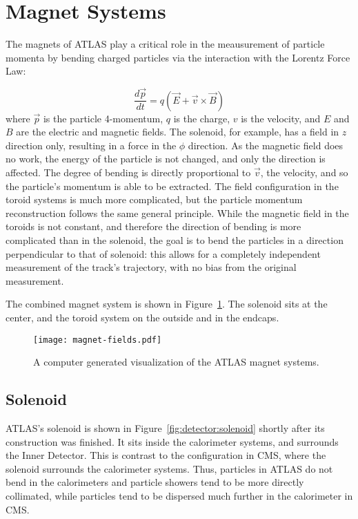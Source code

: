 \section{Magnet Systems}

The magnets of ATLAS play a critical role in the meausurement of particle momenta by bending charged particles via the interaction with the Lorentz Force Law:

\begin{equation}
\frac{d \vec{p}}{d t} = q (\vec{E} + \vec{v} \times \vec{B})
\end{equation}
%
where $\vec{p}$ is the particle 4-momentum, $q$ is the charge, $v$ is the velocity, and $E$ and $B$ are the electric and magnetic fields. The solenoid, for example, has a field in $z$ direction only, resulting in a force in the $\phi$ direction. As the magnetic field does no work, the energy of the particle is not changed, and only the direction is affected. The degree of bending is directly proportional to $\vec{v}$, the velocity, and so the particle's momentum is able to be extracted. The field configuration in the toroid systems is much more complicated, but the particle momentum reconstruction follows the same general principle. While the magnetic field in the toroids is not constant, and therefore the direction of bending is more complicated than in the solenoid, the goal is to bend the particles in a direction perpendicular to that of solenoid: this allows for a completely independent measurement of the track's trajectory, with no bias from the original measurement. 

The combined magnet system is shown in Figure~\ref{fig:detector:magnets}. The solenoid sits at the center, and the toroid system on the outside and in the endcaps.


\begin{figure}
\centering
\texttt{[image: magnet-fields.pdf]}
\label{fig:detector:magnets}
\caption{A computer generated visualization of the ATLAS magnet systems.}
\end{figure}



\subsection{Solenoid}
\label{atlas:magnets:solenoid}

ATLAS's solenoid is shown in Figure~\ref{fig:detector:solenoid} shortly after its construction was finished. It sits inside the calorimeter systems, and surrounds the Inner Detector. This is contrast to the configuration in CMS, where the solenoid surrounds the calorimeter systems. Thus, particles in ATLAS do not bend in the calorimeters and particle showers tend to be more directly collimated, while particles tend to be dispersed much further in the calorimeter in CMS.

